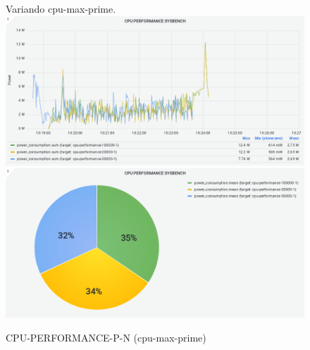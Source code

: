 \documentclass[a4paper, 11pt]{article}
\begin{document}
\begin{figure}[h]
\caption{CPU-PERFORMANCE-P-N (cpu-max-prime)}
\begin{flushleft}
Variando cpu-max-prime.
\includegraphics[scale=0.4]{image8}
\includegraphics[scale=0.4]{image39}
\end{flushleft}
\end{figure}
\end{document}
